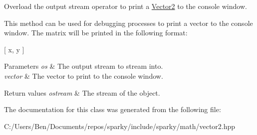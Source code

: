 Overload the output stream operator to print a \hyperlink{classsparky_1_1_vector2}{Vector2} to the console window. 

This method can be used for debugging processes to print a vector to the console window. The matrix will be printed in the following format\+:

\mbox{[} x, y \mbox{]}


\begin{DoxyParams}{Parameters}
{\em os} & The output stream to stream into. \\
\hline
{\em vector} & The vector to print to the console window.\\
\hline
\end{DoxyParams}

\begin{DoxyRetVals}{Return values}
{\em ostream} & The stream of the object. \\
\hline
\end{DoxyRetVals}


The documentation for this class was generated from the following file\+:\begin{DoxyCompactItemize}
\item 
C\+:/\+Users/\+Ben/\+Documents/repos/sparky/include/sparky/math/vector2.\+hpp\end{DoxyCompactItemize}
